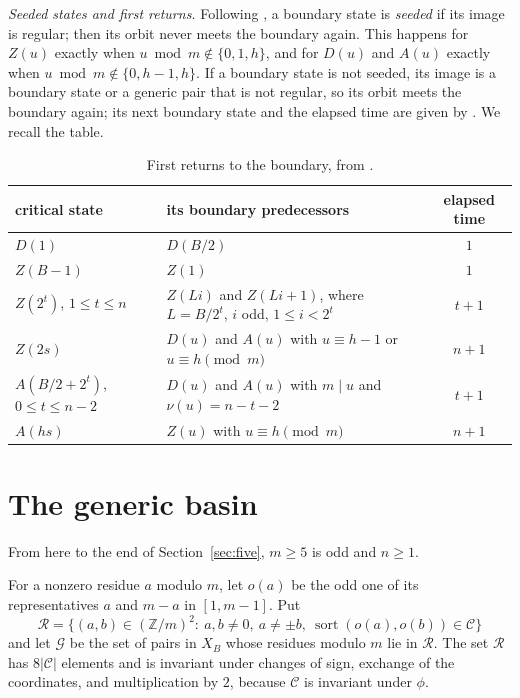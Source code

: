 \documentclass[11pt]{amsart}
\theoremstyle{remark}
\DeclareMathOperator{\sort}{sort}
\newcommand{\C}{\mathcal{C}}
\newcommand{\R}{\mathcal{R}}
\newcommand{\G}{\mathcal{G}}
\newcommand{\vt}{\nu}
\begin{document}
\emph{Seeded states and first returns.} Following \cite{G1}, a boundary state is \emph{seeded} if its image is regular; then its orbit never meets the boundary again. This happens for $Z(u)$ exactly when $u\bmod m\notin\{0,1,h\}$, and for $D(u)$ and $A(u)$ exactly when $u\bmod m\notin\{0,h-1,h\}$. If a boundary state is not seeded, its image is a boundary state or a generic pair that is not regular, so its orbit meets the boundary again; its next boundary state and the elapsed time are given by \cite[Proposition~7 and Table~2]{G1}. We recall the table.

\begin{table}[ht]
\centering
\renewcommand{\arraystretch}{1.15}
\begin{tabular}{@{}lp{6.9cm}c@{}}
\toprule
critical state & its boundary predecessors & elapsed time\\
\midrule
$D(1)$ & $D(B/2)$ & $1$\\
$Z(B-1)$ & $Z(1)$ & $1$\\
$Z(2^t)$, $1\le t\le n$ & $Z(Li)$ and $Z(Li+1)$, where $L=B/2^t$, $i$ odd, $1\le i<2^t$ & $t+1$\\
$Z(2s)$ & $D(u)$ and $A(u)$ with $u\equiv h-1$ or $u\equiv h\pmod m$ & $n+1$\\
$A(B/2+2^t)$, $0\le t\le n-2$ & $D(u)$ and $A(u)$ with $m\mid u$ and $\vt(u)=n-t-2$ & $t+1$\\
$A(hs)$ & $Z(u)$ with $u\equiv h\pmod m$ & $n+1$\\
\bottomrule
\end{tabular}
\caption{First returns to the boundary, from \cite{G1}.}\label{tab:returns}
\end{table}

\section{The generic basin}\label{sec:generic}

From here to the end of Section~\ref{sec:five}, $m\ge5$ is odd and $n\ge1$.

For a nonzero residue $a$ modulo $m$, let $o(a)$ be the odd one of its representatives $a$ and $m-a$ in $[1,m-1]$. Put
\[
\R=\{(a,b)\in(\mathbb Z/m)^2:\ a,b\ne0,\ a\ne\pm b,\ \sort(o(a),o(b))\in\C\}
\]
and let $\G$ be the set of pairs in $X_B$ whose residues modulo $m$ lie in $\R$. The set $\R$ has $8|\C|$ elements and is invariant under changes of sign, exchange of the coordinates, and multiplication by $2$, because $\C$ is invariant under $\phi$.
\end{document}
